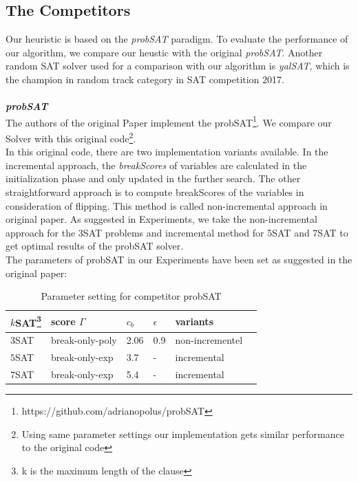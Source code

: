 \documentclass[12pt,a4paper,twoside]{scrartcl}
\numberwithin{equation}{section}
\begin{document}
\subsection{The Competitors}
\label{comparision}
Our heuristic is based on the \emph{probSAT} paradigm. To evaluate the performance of our algorithm, we compare our heustic with the original \emph{probSAT}. Another random SAT solver used for a comparison with our algorithm is \emph{yalSAT}, which is the champion in random track category in SAT competition 2017\cite{biere2014yet}.\\
\\
\emph{\textbf{probSAT}} 
\\
The authors of the original Paper implement the probSAT\footnote{https://github.com/adrianopolus/probSAT}. We compare our Solver with this original code\footnote{Using same parameter settings our implementation gets similar performance to the original code}.  \\
In this original code, there are two implementation variants available. In the incremental approach, the \emph{breakScores} of variables are calculated in the initialization phase and only updated in the further search. The other straightforward approach is to compute breakScores of the variables in consideration of flipping. This method is called non-incremental approach in original paper. As suggested in Experiments, we take the non-incremental approach for the 3SAT problems and incremental method for 5SAT and 7SAT to get optimal results of the probSAT solver.\\
The parameters of probSAT in our Experiments have been set as suggested in the original paper:\\
\begin{table}[h!]
\begin{center}
    \begin{tabular}{| l | l| l | l| l |p{3cm}|}
\hline 
    $k$SAT\footnote{k is the maximum length of the clause} & score $\Gamma$ & $c_b$ & $\epsilon$ &variants \\ \hline
    $3$SAT & break-only-poly& 2.06 & 0.9 &non-incrementel \\ \hline
    $5$SAT & break-only-exp & 3.7 & - & incremental \\ \hline
    $7$SAT &  break-only-exp & 5.4 & - & incremental \\ \hline
\end{tabular}
\caption[probSAT]{Parameter setting for competitor probSAT}
\end{center}
\end{table} 
\end{document}
